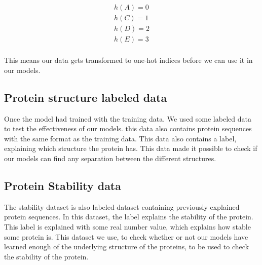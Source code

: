 \begin{align}
h(A) = 0 \\
h(C) = 1 \\
h(D) = 2 \\
h(E) = 3 \\
\end{align}

\noindent
This means our data gets transformed to one-hot indices before we can use it in our models.

\subsection{Protein structure labeled data}
Once the model had trained with the training data. We used some labeled data to test the effectiveness of our models. this data also contains protein sequences with the same format as the training data. This data also contains a label, explaining which structure the protein has. This data made it possible to check if our models can find any separation between the different structures.


\subsection{Protein Stability data}
The stability dataset is also labeled dataset containing previously explained protein sequences. In this dataset, the label explains the stability of the protein. This label is explained with some real number value, which explains how stable some protein is. This dataset we use, to check whether or not our models have learned enough of the underlying structure of the proteins, to be used to check the stability of the protein.